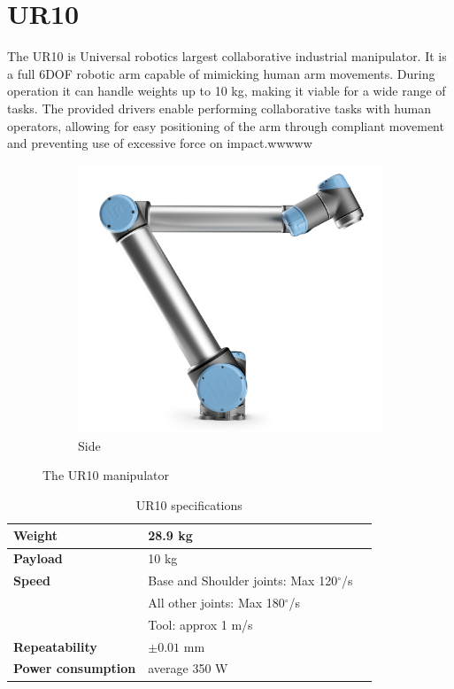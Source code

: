 \documentclass[times, utf8, diplomski, english]{fer}
\begin{document}
\section{UR10} 
The UR10 is Universal robotics largest collaborative industrial manipulator.
It is a full 6DOF robotic arm capable of mimicking human arm movements.
During operation it can handle weights up to 10 kg, making it viable for a wide range of tasks.
The provided drivers enable performing collaborative tasks with human operators, allowing for easy positioning of the arm through compliant movement and preventing use of excessive force on impact.wwwww
\begin{figure}[t!]
    \centering
    \begin{subfigure}[t]{0.34\textwidth}
        \includegraphics[width=\textwidth]{ur10_right}
        \caption{Side}
    \end{subfigure}
    \caption{The UR10 manipulator}\label{fig:ur10}
\end{figure}
\begin{table}[]
\centering
\caption{UR10 specifications}
\label{table:ur10 specs}
\begin{tabular}{@{}lll@{}}
\toprule
\textbf{Weight}&  28.9 kg& \\ \midrule
\textbf{Payload}&  10 kg&  \\ \midrule
\textbf{Speed}&  Base and Shoulder joints: Max 120$^{\circ}$/s&  \\
&  All other joints: Max 180$^{\circ}$/s&   \\
&  Tool: approx 1 m/s& \\ \midrule
\textbf{Repeatability}& $\pm0.01$ mm& \\ \midrule
\textbf{Power consumption}& average 350 W& \\ \bottomrule
\end{tabular}
\end{table}
\end{document}
